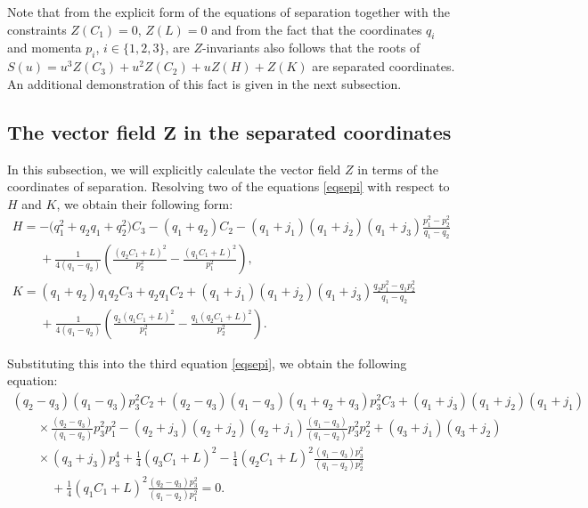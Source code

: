 \documentclass[10pt,a4paper]{amsart}
\numberwithin{equation}{section}
\begin{document}
\begin{Remark}
Note that from the explicit form of the equations of separation together with the constraints $Z(C_1)=0$, $Z(L)=0$ and from the fact that the coordinates $q_i$ and momenta $p_i$, $i\in \{1,2,3\}$, are $Z$-invariants also follows that
 the roots of $S(u)=u^3 Z(C_3)+ u^2 Z(C_2)+u Z(H)+Z(K)$ are separated coordinates. An additional demonstration of this fact is given in the next subsection.
\end{Remark}

\subsection[The vector field Z in the separated coordinates]{The vector field $\boldsymbol{Z}$ in the separated coordinates}
In this subsection, we will explicitly calculate the vector field $Z$ in terms of the coordinates of separation.
Resolving two of the equations \eqref{eqsepi} with respect to $H$ and $K$, we obtain their following form:
\begin{subequations}\label{h-k}
\begin{gather}
H = -\big(q_1^2+q_2q_1+q_2^2\big)C_3-(q_1+q_2)C_2-(q_1+j_1)(q_1+j_2)(q_1+j_3) \frac{p_1^2-p_2^2}{q_1-q_2}\nonumber\\
\phantom{H=}{}+
\frac{1}{4(q_1-q_2)}\left(\frac{(q_2C_1+L)^2}{p_2^2}-\frac{(q_1C_1+L)^2}{p_1^2}\right),
\\
K =(q_1+q_2)q_1q_2C_3+ q_2q_1C_2+(q_1+j_1)(q_1+j_2)(q_1+j_3)\frac{q_2 p_1^2- q_1 p_2^2}{q_1-q_2}
 \nonumber\\
\phantom{K=}{}+
\frac{1}{4(q_1-q_2)}\left(\frac{q_2(q_1C_1+L)^2}{p_1^2}- \frac{q_1(q_2C_1+L)^2}{p_2^2}\right).
\end{gather}
\end{subequations}

Substituting this into the third equation \eqref{eqsepi}, we obtain the following equation:
\begin{gather}
(q_2-q_3) (q_1-q_3) p_3^2 C_2+(q_2-q_3) (q_1-q_3) (q_1+q_2+q_3) p_3^2 C_3+ (q_1+j_3) (q_1+j_2) (q_1+j_1)\nonumber\\
\qquad\times \frac{ (q_2-q_3)}{(q_1 -q_2)} p_3^2 p_1^2
-(q_2+j_3) (q_2+j_2) (q_2+j_1)\frac{(q_1-q_3) }{(q_1-q_2)} p_3^2 p_2^2+(q_3+j_1) (q_3+j_2)\nonumber\\
\qquad\times (q_3+j_3) p_3^4+ \frac{1}{4} (q_3 C_1+L)^2-\frac{1}{4} (q_2 C_1+L)^2
\frac{(q_1-q_3) p_3^2}{(q_1-q_2) p_2^2}\nonumber\\
\phantom{\qquad\times}{}+ \frac{1}{4}(q_1 C_1+L)^2 \frac{(q_2-q_3) p_3^2}{(q_1-q_2) p_1^2}=0.\label{eqsep3'}
\end{gather}
\end{document}
